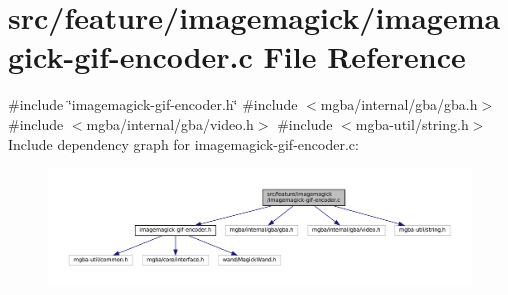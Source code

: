 \hypertarget{imagemagick-gif-encoder_8c}{}\section{src/feature/imagemagick/imagemagick-\/gif-\/encoder.c File Reference}
\label{imagemagick-gif-encoder_8c}
{\ttfamily \#include \char`\"{}imagemagick-\/gif-\/encoder.\+h\char`\"{}}\newline
{\ttfamily \#include $<$mgba/internal/gba/gba.\+h$>$}\newline
{\ttfamily \#include $<$mgba/internal/gba/video.\+h$>$}\newline
{\ttfamily \#include $<$mgba-\/util/string.\+h$>$}\newline
Include dependency graph for imagemagick-\/gif-\/encoder.c\+:
\nopagebreak
\begin{figure}[H]
\begin{center}
\leavevmode
\includegraphics[width=350pt]{imagemagick-gif-encoder_8c__incl}
\end{center}
\end{figure}
